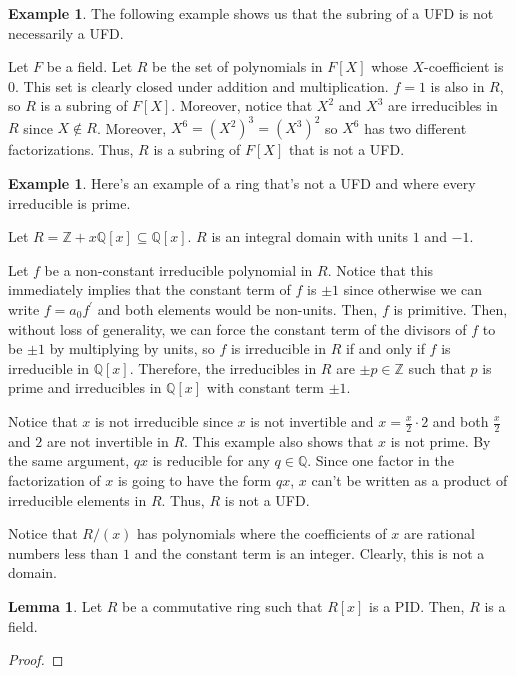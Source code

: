 \documentclass{article}
\theoremstyle{definition}
\newtheorem{lemma}[theorem]{Lemma}
\newtheorem{example}[theorem]{Example}
\newcommand{\Z}{\mathbb{Z}}
\newcommand{\Q}{\mathbb{Q}}
\begin{document}
\begin{example}
The following example shows us that the subring of a UFD is not necessarily a UFD.

Let $F$ be a field. 
Let $R$ be the set of polynomials in $F[X]$ whose $X$-coefficient is 0. This set is clearly closed under addition and multiplication. $f = 1$ is also in $R$, so $R$ is a subring of $F[X]$. Moreover, notice that $X^{2}$ and $X^{3}$ are irreducibles in $R$ since $X \notin R$. Moreover, $X^{6} = (X^{2})^{3} = (X^{3})^{2}$ so $X^{6}$ has two different factorizations. Thus, $R$ is a subring of $F[X]$ that is not a UFD.
\end{example}

\begin{example}
    Here's an example of a ring that's not a UFD and where every irreducible is prime.

    Let $R = \Z + x \Q[x] \subseteq \Q[x]$. $R$ is an integral domain with units $1$ and $-1$. 

    Let $f$ be a non-constant irreducible polynomial in $R$. Notice that this immediately implies that the constant term of $f$ is $\pm 1$ since otherwise we can write $f = a_{0} f^{\prime}$ and both elements would be non-units. Then, $f$ is primitive. Then, without loss of generality, we can force the constant term of the divisors of $f$ to be $\pm 1$ by multiplying by units, so $f$ is irreducible in $R$ if and only if $f$ is irreducible in $\Q[x]$. Therefore, the irreducibles in $R$ are $\pm p \in \Z$ such that $p$ is prime and irreducibles in $\Q[x]$ with constant term $\pm 1$. 

    Notice that $x$ is not irreducible since $x$ is not invertible and $x = \frac{x}{2} \cdot 2$ and both $\frac{x}{2}$ and $2$ are not invertible in $R$. This example also shows that $x$ is not prime. By the same argument, $qx$ is reducible for any $q \in \Q$. Since one factor in the factorization of $x$ is going to have the form $qx$, $x$ can't be written as a product of irreducible elements in $R$. Thus, $R$ is not a UFD.

    Notice that $R/(x)$ has polynomials where the coefficients of $x$ are rational numbers less than $1$ and the constant term is an integer. Clearly, this is not a domain. 

\end{example}

\begin{lemma}
    Let $R$ be a commutative ring such that $R[x]$ is a PID. Then, $R$ is a field.
\end{lemma}
\begin{proof}
    
\end{proof}
\end{document}
